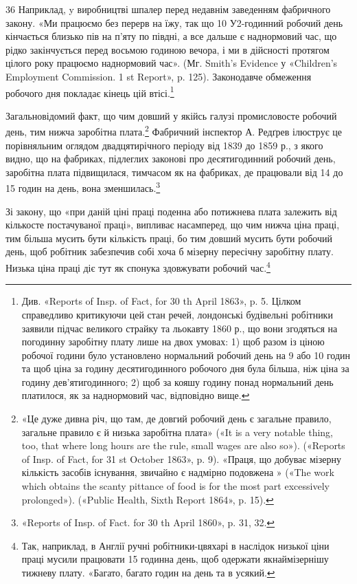 36    Наприклад, y виробництві шпалер перед недавнім заведенням
фабричного закону. «Ми працюємо без перерв на їжу, так що 10 У2-годинний
робочий день кінчається близько пів на п’яту по півдні, а все
дальше є наднормовий час, що рідко закінчується перед восьмою годиною
вечора, і ми в дійсності протягом цілого року працюємо наднормовий
час». (Мг. Smith’s Evidence у «Children’s Employment Commission.
1 st Report», p. 125).
Законодавче обмеження робочого дня покладає кінець цій втісі.\footnote{
Див. «Reports of Insp. of Fact, for 30 th April 1863», p. 5. Цілком
справедливо критикуючи цей стан речей, лондонські будівельні робітники
заявили підчас великого страйку та льокавту 1860 р., що вони згодяться
на погодинну заробітну плату лише на двох умовах: 1) щоб разом
із ціною робочої години було установлено нормальний робочий день на
9 або 10 годин та щоб ціна за годину десятигодинного робочого дня була
більша, ніж ціна за годину дев’ятигодинного; 2) щоб за кояшу годину
понад нормальний день платилося, як за наднормовий час, відповідно вище.
}

Загальновідомий факт, що чим довший у якійсь галузі промисловосте
робочий день, тим нижча заробітна плата.\footnote{
«Це дуже дивна річ, що там, де довгий робочий день є загальне
правило, загальне правило є й низька заробітна плата» («It is a very
notable thing, too, that where long hours are the rule, small wages are also
so»). («Reports of Insp. of Fact, for 31 st October 1863», p. 9). «Праця, що
добуває мізерну кількість засобів існування, звичайно є надмірно подовжена
» («The work which obtains the scanty pittance of food is for the most
part excessively prolonged»). («Public Health, Sixth Report 1864», p. 15).
} Фабричний
інспектор А. Редґрев ілюструє це порівняльним оглядом
двадцятирічного періоду від 1839 до 1859 р., з якого видно, що
на фабриках, підлеглих законові про десятигодинний робочий
день, заробітна плата підвищилася, тимчасом як на фабриках,
де працювали від 14 до 15 годин на день, вона зменшилась.\footnote{
«Reports of Insp. of Fact. for 30 th April 1860», p. 31, 32.
}

Зі закону, що «при даній ціні праці поденна або потижнева
плата залежить від кількосте постачуваної праці», випливає
насамперед, що чим нижча ціна праці, тим більша мусить бути
кількість праці, бо тим довший мусить бути робочий день, щоб
робітник забезпечив собі хоча б мізерну пересічну заробітну плату.
Низька ціна праці діє тут як спонука здовжувати робочий час.\footnote{
Так, наприклад, в Англії ручні робітники-цвяхарі в наслідок
низької ціни праці мусили працювати 15 годинна день, щоб одержати якнаймізернішу
тижневу плату. «Багато, багато годин на день та в усякий.
}

